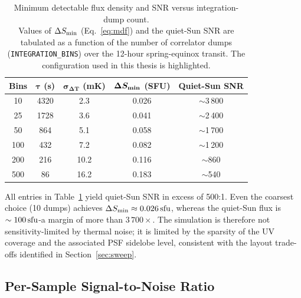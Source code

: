 \begin{table}[H]
  \centering
  \caption[Minimum detectable flux density and SNR versus integration-dump count]{Minimum detectable flux density and SNR versus integration-dump count.\\[4pt]
  Values of $\Delta S_{\rm min}$ (Eq.~\eqref{eq:mdf}) and the quiet-Sun SNR
  are tabulated as a function of the number of correlator dumps
  (\texttt{INTEGRATION\_BINS})
  over the 12-hour spring-equinox transit.
  The configuration used in this thesis is highlighted.}
  \label{tab:snr-bins}
  \renewcommand{\arraystretch}{1.3}
  \begin{tabular}{c c c c c}
    \toprule
    \textbf{Bins} & $\boldsymbol{\tau}$ (s) & $\boldsymbol{\sigma_{\Delta T}}$ (mK)
      & $\boldsymbol{\Delta S_{\rm min}}$ (SFU) & \textbf{Quiet-Sun SNR} \\
    \midrule
    10   & 4320 & 2.3  & 0.026 & $\sim$3\,800 \\
    25   & 1728 & 3.6  & 0.041 & $\sim$2\,400 \\
    \rowcolor{LightCyan}
    50   & 864  & 5.1  & 0.058 & $\sim$1\,700 \\
    100  & 432  & 7.2  & 0.082 & $\sim$1\,200 \\
    200  & 216  & 10.2 & 0.116 & $\sim$860   \\
    500  & 86   & 16.2 & 0.183 & $\sim$540   \\
    \bottomrule
  \end{tabular}
\end{table}

All entries in Table~\ref{tab:snr-bins} yield quiet-Sun SNR in excess of
500:1. Even the coarsest choice (10 dumps) achieves
$\Delta S_{\rm min}\approx\SI{0.026}{\mathrm{sfu}}$, whereas the quiet-Sun flux
is $\sim\SI{100}{\mathrm{sfu}}$-a margin of more than $3\,700\times$. The
simulation is therefore not sensitivity-limited by thermal noise; it is
limited by the sparsity of the UV coverage and the associated PSF sidelobe
level, consistent with the layout trade-offs identified in Section~\ref{sec:sweep}.

\subsection{Per-Sample Signal-to-Noise Ratio}

